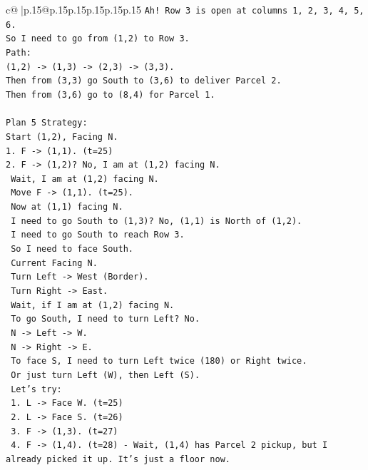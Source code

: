\documentclass{article}
\begin{document}
{\begin{supertabular}{c@{$\;$}|p{.15\linewidth}@{}p{.15\linewidth}p{.15\linewidth}p{.15\linewidth}p{.15\linewidth}p{.15\linewidth}}
{{{\texttt{Ah! Row 3 is open at columns 1, 2, 3, 4, 5, 6.} \\
\texttt{So I need to go from (1,2) to Row 3.} \\
\texttt{Path:} \\
\texttt{(1,2) {-}> (1,3) {-}> (2,3) {-}> (3,3).} \\
\texttt{Then from (3,3) go South to (3,6) to deliver Parcel 2.} \\
\texttt{Then from (3,6) go to (8,4) for Parcel 1.} \\
\\ 
\texttt{Plan 5 Strategy:} \\
\texttt{Start (1,2), Facing N.} \\
\texttt{1. F {-}> (1,1). (t=25)} \\
\texttt{2. F {-}> (1,2)? No, I am at (1,2) facing N.} \\
\texttt{   Wait, I am at (1,2) facing N.} \\
\texttt{   Move F {-}> (1,1). (t=25).} \\
\texttt{   Now at (1,1) facing N.} \\
\texttt{   I need to go South to (1,3)? No, (1,1) is North of (1,2).} \\
\texttt{   I need to go South to reach Row 3.} \\
\texttt{   So I need to face South.} \\
\texttt{   Current Facing N.} \\
\texttt{   Turn Left {-}> West (Border).} \\
\texttt{   Turn Right {-}> East.} \\
\texttt{   Wait, if I am at (1,2) facing N.} \\
\texttt{   To go South, I need to turn Left? No.} \\
\texttt{   N {-}> Left {-}> W.} \\
\texttt{   N {-}> Right {-}> E.} \\
\texttt{   To face S, I need to turn Left twice (180) or Right twice.} \\
\texttt{   Or just turn Left (W), then Left (S).} \\
\texttt{   Let's try:} \\
\texttt{   1. L {-}> Face W. (t=25)} \\
\texttt{   2. L {-}> Face S. (t=26)} \\
\texttt{   3. F {-}> (1,3). (t=27)} \\
\texttt{   4. F {-}> (1,4). (t=28) {-} Wait, (1,4) has Parcel 2 pickup, but I already picked it up. It's just a floor now.} \\
}}}
\end{supertabular}}
\end{document}
